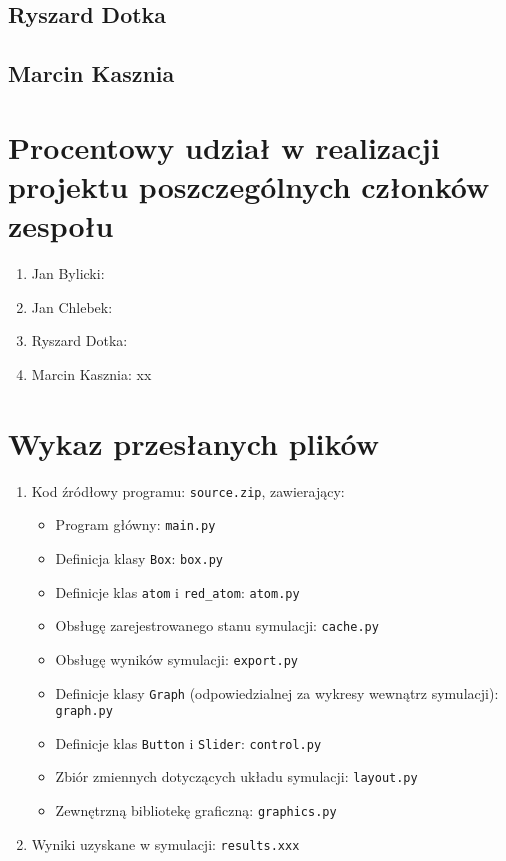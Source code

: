 \documentclass{article}
\begin{document}
    \subsection{Ryszard Dotka}
    \subsection{Marcin Kasznia}

\section{Procentowy udział w realizacji projektu poszczególnych członków zespołu}
\begin{enumerate}
    \item Jan Bylicki:
    \item Jan Chlebek:
    \item Ryszard Dotka:
    \item Marcin Kasznia: xx 
\end{enumerate}
\section{Wykaz przesłanych plików}
    \begin{enumerate}
        \item Kod źródłowy programu: \verb+source.zip+, zawierający:
        \begin{itemize}
            \item Program główny: \verb+main.py+
            \item Definicja klasy \verb+Box+: \verb+box.py+
            \item Definicje klas \verb+atom+ i \verb+red_atom+: \verb+atom.py+
            \item Obsługę zarejestrowanego stanu symulacji: \verb+cache.py+
            \item Obsługę wyników symulacji: \verb+export.py+
            \item Definicje klasy \verb+Graph+ (odpowiedzialnej za wykresy wewnątrz symulacji): \verb+graph.py+
            \item Definicje klas \verb+Button+ i \verb+Slider+: \verb+control.py+
            \item Zbiór zmiennych dotyczących układu symulacji: \verb+layout.py+
            \item Zewnętrzną bibliotekę graficzną: \verb+graphics.py+
        \end{itemize}
        \item Wyniki uzyskane w symulacji: \verb+results.xxx+
    \end{enumerate}
\end{document}
